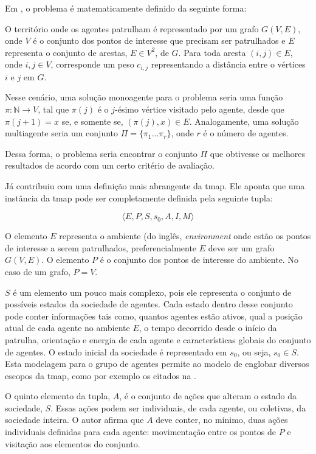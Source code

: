 Em \citep{Chevaleyre:2004:TAM:1018411.1019013}, o problema é matematicamente 
definido da seguinte forma:

O território onde os agentes patrulham é representado por um grafo $G(V,E)$, 
onde $V$ é o conjunto dos pontos de interesse que precisam ser patrulhados e 
$E$ representa o conjunto de arestas, $E \in V^{2}$, de $G$. Para toda aresta 
$(i,j) \in E$, onde $i,j \in V$, corresponde um peso $c_{i,j}$ representando a 
distância entre o vértices $i$ e $j$ em $G$. 

Nesse cenário, uma solução monoagente para o problema seria uma função 
$ \pi : \mathbb{N} \longrightarrow V$, tal que $ \pi(j)$ 
é o $j$-ésimo vértice visitado pelo agente, desde que 
$ \pi(j+1) = x $ se, e somente se, $ (\pi(j), x) \in E $. Analogamente, 
uma solução multiagente seria um conjunto $ \Pi = \{ \pi_{1} ... \pi_{r} \}$, 
onde $r$ é o número de agentes.

Dessa forma, o problema seria encontrar o conjunto $ \Pi $ que obtivesse os 
melhores resultados de acordo com um certo critério de avaliação.

Já \citep{sampaiophd} contribuiu com uma definição mais abrangente da \ac{tmap}. 
Ele aponta que uma instância da \ac{tmap} pode ser completamente definida pela 
seguinte tupla: 

$$ \langle E, P, S, s_{0}, A, I, M \rangle $$

O elemento $E$ representa o ambiente (do inglês, \textit{environment} onde estão 
os pontos de interesse a serem patrulhados, preferencialmente $E$ deve ser um 
grafo $G(V,E)$. O elemento $P$ é o conjunto dos pontos de interesse do ambiente. 
No caso de um grafo, $P = V$.

$S$ é um elemento um pouco mais complexo, pois ele 
representa o conjunto de possíveis estados da sociedade de agentes. Cada estado 
dentro desse conjunto pode conter informações tais como, quantos agentes estão 
ativos, qual a posição atual de cada agente no ambiente $E$, o tempo decorrido 
desde o início da patrulha, orientação e energia de cada agente e 
características globais do conjunto de agentes. O estado inicial da sociedade é 
representado em $s_{0}$, ou seja, $s_{0} \in S$. Esta modelagem para o grupo de 
agentes permite ao modelo de \citep{sampaiophd} englobar diversos escopos da 
\ac{tmap}, como por exemplo os citados na .

O quinto elemento da tupla, $A$, é o conjunto de ações que alteram o estado da 
sociedade, $S$. Essas ações podem ser individuais, de cada agente, ou coletivas, 
da sociedade inteira. O autor afirma que $A$ deve conter, no mínimo, duas ações 
individuais definidas para cada agente: movimentação entre os pontos de $P$ e 
visitação aos elementos do conjunto.

